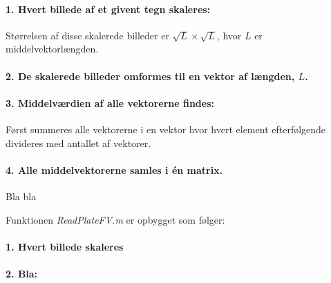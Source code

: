 
\paragraph{1. Hvert billede af et givent tegn skaleres:} Størrelsen af disse skalerede billeder er $\sqrt{L} \times \sqrt{L}$, hvor $L$ er middelvektorlængden.

\paragraph{2. De skalerede billeder omformes til en vektor af længden, $L$.}

\paragraph{3. Middelværdien af alle vektorerne findes:} Først summeres alle vektorerne i en vektor hvor hvert element efterfølgende divideres med antallet af vektorer.

\paragraph{4. Alle middelvektorerne samles i én matrix.} Bla bla


Funktionen \textit{ReadPlateFV.m} er opbygget som følger:

\paragraph{1. Hvert billede skaleres}

\paragraph{2. Bla:}

